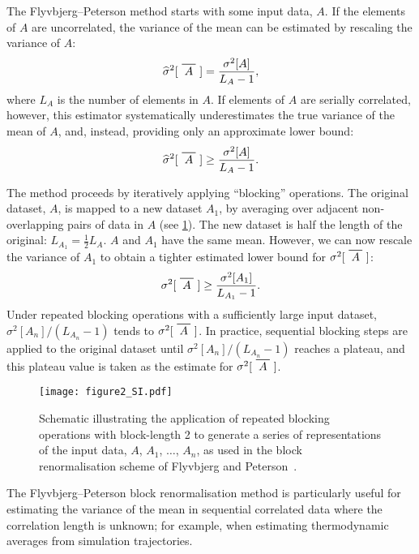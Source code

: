 \documentclass[reprint,superscriptaddress,nobibnotes,amsmath,amssymb,aps,prx,hidelinks]{revtex4-2}
\newcommand{\var}[1]{\ensuremath{\sigma^2[#1]}}
\newcommand{\varest}[1]{\ensuremath{\widehat{\sigma}^2[#1]}}
\newcommand*\xbar[1]{
  \hbox{
    \vbox{
      \hrule height 0.5pt 
      \kern0.5ex
      \hbox{
        \kern-0.1em
        \ensuremath{#1}
        \kern-0.1em
      }
    }
  }
}
\begin{document}
The Flyvbjerg--Peterson method starts with some input data, $A$.
If the elements of $A$ are uncorrelated, the variance of the mean can be estimated by rescaling the variance of $A$:
\begin{equation}
\varest{\xbar{A}}=\frac{\var{A}}{L_A-1},
\end{equation}
where $L_A$ is the number of elements in $A$.
If elements of $A$ are serially correlated, however, this estimator systematically underestimates the true variance of the mean of $A$, and, instead, providing only an approximate lower bound:
\begin{equation}
\varest{\xbar{A}}\geq\frac{\var{A}}{L_{A}-1}.
\end{equation}

The method proceeds by iteratively applying ``blocking'' operations.
The original dataset, $A$, is mapped to a new dataset $A_1$, by averaging over adjacent non-overlapping pairs of data in $A$ (see \cref{fig:blocking}).
The new dataset is half the length of the original: $L_{A_1} = \frac{1}{2}L_{A}$.
$A$ and $A_1$ have the same mean.
However, we can now rescale the variance of $A_1$ to obtain a tighter estimated lower bound for \var{\xbar{A}}:
\begin{equation}
\label{equ:blocking}
\var{\xbar{A}}\geq\frac{\var{A_1}} {L_{A_1}-1}.
\end{equation}
Under repeated blocking operations with a sufficiently large input dataset, $\var{A_n}/(L_{A_n}-1)$ tends to \var{\xbar{A}}.
In practice, sequential blocking steps are applied to the original dataset until $\var{A_n}/(L_{A_n}-1)$ reaches a plateau, and this plateau value is taken as the estimate for \var{\xbar{A}}.

\begin{figure}[tb]
  \centering
  \texttt{[image: figure2\_SI.pdf]}
    \caption{\label{fig:blocking}Schematic illustrating the application of repeated blocking operations with block-length 2 to generate a series of representations of the input data, $A$, $A_1$, $\ldots$, $A_n$, as used in the block renormalisation scheme of Flyvbjerg and Peterson~\cite{FlyvbjergAndPetersen_JChemPhys1989}.}
\end{figure}

The Flyvbjerg--Peterson block renormalisation method is particularly useful for estimating the variance of the mean in sequential correlated data where the correlation length is unknown; for example, when estimating thermodynamic averages from simulation trajectories.
\end{document}
